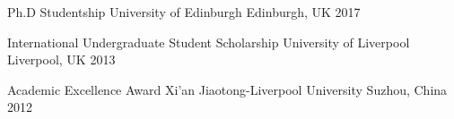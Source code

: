 


\begin{cvhonors}

  \cvhonor
    {Ph.D Studentship} %
    {University of Edinburgh} %
    {Edinburgh, UK} %
    {2017} %

  \cvhonor
    {International Undergraduate Student Scholarship} %
    {University of Liverpool} %
    {Liverpool, UK} %
    {2013} %

  \cvhonor
    {Academic Excellence Award} %
    {Xi’an Jiaotong-Liverpool University} %
    {Suzhou, China} %
    {2012} %

\end{cvhonors}
